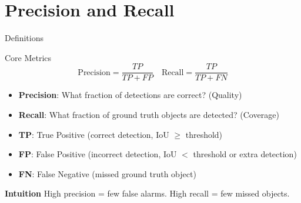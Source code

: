 \documentclass[usenames,dvipsnames]{beamer}
\begin{document}
	\section{Precision and Recall}
	
	\begin{frame}{Definitions}
		\begin{definitionbox}{Core Metrics}
			$$\text{Precision} = \frac{TP}{TP + FP} \quad \text{Recall} = \frac{TP}{TP + FN}$$
		\end{definitionbox}
		
		\vspace{1em}
		\begin{itemize}
			\item \textbf{Precision}: What fraction of detections are correct? (Quality)
			\item \textbf{Recall}: What fraction of ground truth objects are detected? (Coverage)
			\item \textbf{TP}: True Positive (correct detection, IoU $\geq$ threshold)
			\item \textbf{FP}: False Positive (incorrect detection, IoU $<$ threshold or extra detection)
			\item \textbf{FN}: False Negative (missed ground truth object)
		\end{itemize}
		
		\begin{keypointsbox}
	\textbf{Intuition}
		High precision = few false alarms. High recall = few missed objects.
		\end{keypointsbox}
	\end{frame}
	
\end{document}
